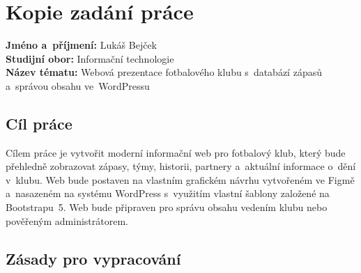 \documentclass[12pt,a4paper]{article}
\begin{document}
\newpage
\appendix

\section{Kopie zadání práce}

\textbf{Jméno a~příjmení:} Lukáš Bejček\\
\textbf{Studijní obor:} Informační technologie\\
\textbf{Název tématu:} Webová prezentace fotbalového klubu s~databází zápasů a~správou obsahu ve~WordPressu

\subsection*{Cíl práce}

Cílem práce je vytvořit moderní informační web pro fotbalový klub, který bude přehledně zobrazovat zápasy, týmy, historii, partnery a~aktuální informace o~dění v~klubu. Web bude postaven na vlastním grafickém návrhu vytvořeném ve Figmě a~nasazeném na systému WordPress s~využitím vlastní šablony založené na Bootstrapu~5. Web bude připraven pro správu obsahu vedením klubu nebo pověřeným administrátorem.

\subsection*{Zásady pro vypracování}
\end{document}
